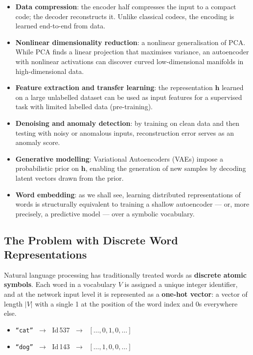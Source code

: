 \documentclass[11pt,a4paper]{article}
\newcommand{\term}[1]{\textcolor{DefGreen}{\textbf{#1}}\index{#1}}
\begin{document}
\begin{itemize}
  \item \textbf{Data compression}: the encoder half compresses the input to a compact code; the decoder reconstructs it. Unlike classical codecs, the encoding is learned end-to-end from data.
  \item \textbf{Nonlinear dimensionality reduction}: a nonlinear generalisation of PCA. While PCA finds a linear projection that maximises variance, an autoencoder with nonlinear activations can discover curved low-dimensional manifolds in high-dimensional data.
  \item \textbf{Feature extraction and transfer learning}: the representation $\mathbf{h}$ learned on a large unlabelled dataset can be used as input features for a supervised task with limited labelled data (pre-training).
  \item \textbf{Denoising and anomaly detection}: by training on clean data and then testing with noisy or anomalous inputs, reconstruction error serves as an anomaly score.
  \item \textbf{Generative modelling}: Variational Autoencoders (VAEs) impose a probabilistic prior on $\mathbf{h}$, enabling the generation of new samples by decoding latent vectors drawn from the prior.
  \item \textbf{Word embedding}: as we shall see, learning distributed representations of words is structurally equivalent to training a shallow autoencoder — or, more precisely, a predictive model — over a symbolic vocabulary.
\end{itemize}

\subsection{The Problem with Discrete Word Representations}
\label{sec:we_problem}

Natural language processing has traditionally treated words as \textbf{discrete atomic symbols}. Each word in a vocabulary $V$ is assigned a unique integer identifier, and at the network input level it is represented as a \term{one-hot vector}: a vector of length $|V|$ with a single 1 at the position of the word index and 0s everywhere else.

\begin{itemize}
  \item \texttt{``cat''} $\;\to\;$ Id\,537 $\;\to\;$ $[\ldots, 0, 1, 0, \ldots]$
  \item \texttt{``dog''} $\;\to\;$ Id\,143 $\;\to\;$ $[\ldots, 1, 0, 0, \ldots]$
\end{itemize}
\end{document}
